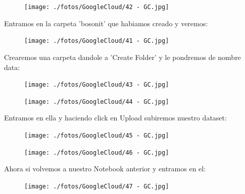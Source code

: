 \documentclass[a4paper,10pt]{article}
\begin{document}
\begin{figure}[H]
\begin{center}
\texttt{[image: ./fotos/GoogleCloud/42 - GC.jpg]}
\end{center}
\end{figure}

Entramos en la carpeta 'bosonit' que habiamos creado y veremos:

\begin{figure}[H]
\begin{center}
\texttt{[image: ./fotos/GoogleCloud/41 - GC.jpg]}
\end{center}
\end{figure}

Crearemos una carpeta dandole a 'Create Folder' y le pondremos de nombre data:

\begin{figure}[H]
\begin{center}
\texttt{[image: ./fotos/GoogleCloud/43 - GC.jpg]}
\end{center}
\end{figure}

\begin{figure}[H]
\begin{center}
\texttt{[image: ./fotos/GoogleCloud/44 - GC.jpg]}
\end{center}
\end{figure}

Entramos en ella y haciendo click en Upload subiremos nuestro dataset:

\begin{figure}[H]
\begin{center}
\texttt{[image: ./fotos/GoogleCloud/45 - GC.jpg]}
\end{center}
\end{figure}

\begin{figure}[H]
\begin{center}
\texttt{[image: ./fotos/GoogleCloud/46 - GC.jpg]}
\end{center}
\end{figure}

Ahora si volvemos a nuestro Notebook anterior y entramos en el:

\begin{figure}[H]
\begin{center}
\texttt{[image: ./fotos/GoogleCloud/47 - GC.jpg]}
\end{center}
\end{figure}
\end{document}
